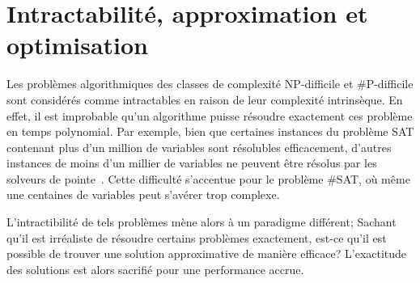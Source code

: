 \section{Intractabilité, approximation et optimisation}
\label{intractabilite-approximation-et-optimisation}

Les problèmes algorithmiques des classes de complexité \textsf{NP}-difficile et \textsf{\#P}-difficile sont considérés comme intractables en raison de leur complexité intrinsèque. En effet, il est improbable qu'un algorithme puisse résoudre exactement ces problème en temps polynomial. Par exemple, bien que certaines instances du problème SAT contenant plus d'un million de variables sont résolubles efficacement, d'autres instances de moins d'un millier de variables ne peuvent être résolus par les solveurs de pointe~\cite{froleyksSATCompetition20202021}. Cette difficulté s'accentue pour le problème \#SAT, où même une centaines de variables peut s'avérer trop complexe. 

L'intractibilité de tels problèmes mène alors à un paradigme différent; Sachant qu'il est irréaliste de résoudre certains problèmes exactement, est-ce qu'il est possible de trouver une solution approximative de manière efficace? L'exactitude des solutions est alors sacrifié pour une performance accrue.

